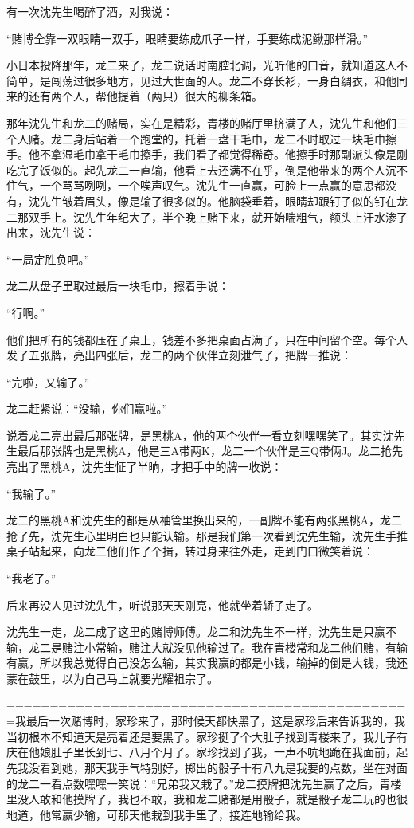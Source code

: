\documentclass[12pt,UTF8]{ctexbook}
\begin{document}
有一次沈先生喝醉了酒，对我说：

“赌博全靠一双眼睛一双手，眼睛要练成爪子一样，手要练成泥鳅那样滑。”

小日本投降那年，龙二来了，龙二说话时南腔北调，光听他的口音，就知道这人不简单，是闯荡过很多地方，见过大世面的人。龙二不穿长衫，一身白绸衣，和他同来的还有两个人，帮他提着（两只）很大的柳条箱。

那年沈先生和龙二的赌局，实在是精彩，青楼的赌厅里挤满了人，沈先生和他们三个人赌。龙二身后站着一个跑堂的，托着一盘干毛巾，龙二不时取过一块毛巾擦手。他不拿湿毛巾拿干毛巾擦手，我们看了都觉得稀奇。他擦手时那副派头像是刚吃完了饭似的。起先龙二一直输，他看上去还满不在乎，倒是他带来的两个人沉不住气，一个骂骂咧咧，一个唉声叹气。沈先生一直赢，可脸上一点赢的意思都没有，沈先生皱着眉头，像是输了很多似的。他脑袋垂着，眼睛却跟钉子似的钉在龙二那双手上。沈先生年纪大了，半个晚上赌下来，就开始喘粗气，额头上汗水渗了出来，沈先生说：

“一局定胜负吧。”

龙二从盘子里取过最后一块毛巾，擦着手说：

“行啊。”

他们把所有的钱都压在了桌上，钱差不多把桌面占满了，只在中间留个空。每个人发了五张牌，亮出四张后，龙二的两个伙伴立刻泄气了，把牌一推说：

“完啦，又输了。”

龙二赶紧说：“没输，你们赢啦。”

说着龙二亮出最后那张牌，是黑桃A，他的两个伙伴一看立刻嘿嘿笑了。其实沈先生最后那张牌也是黑桃A，他是三A带两K，龙二一个伙伴是三Q带俩J。龙二抢先亮出了黑桃A，沈先生怔了半晌，才把手中的牌一收说：

“我输了。”

龙二的黑桃A和沈先生的都是从袖管里换出来的，一副牌不能有两张黑桃A，龙二抢了先，沈先生心里明白也只能认输。那是我们第一次看到沈先生输，沈先生手推桌子站起来，向龙二他们作了个揖，转过身来往外走，走到门口微笑着说：

“我老了。”

后来再没人见过沈先生，听说那天天刚亮，他就坐着轿子走了。

沈先生一走，龙二成了这里的赌博师傅。龙二和沈先生不一样，沈先生是只赢不输，龙二是赌注小常输，赌注大就没见他输过了。我在青楼常和龙二他们赌，有输有赢，所以我总觉得自己没怎么输，其实我赢的都是小钱，输掉的倒是大钱，我还蒙在鼓里，以为自己马上就要光耀祖宗了。

===============================================我最后一次赌博时，家珍来了，那时候天都快黑了，这是家珍后来告诉我的，我当初根本不知道天是亮着还是要黑了。家珍挺了个大肚子找到青楼来了，我儿子有庆在他娘肚子里长到七、八月个月了。家珍找到了我，一声不吭地跪在我面前，起先我没看到她，那天我手气特别好，掷出的骰子十有八九是我要的点数，坐在对面的龙二一看点数嘿嘿一笑说：“兄弟我又栽了。”龙二摸牌把沈先生赢了之后，青楼里没人敢和他摸牌了，我也不敢，我和龙二赌都是用骰子，就是骰子龙二玩的也很地道，他常赢少输，可那天他栽到我手里了，接连地输给我。
\end{document}
